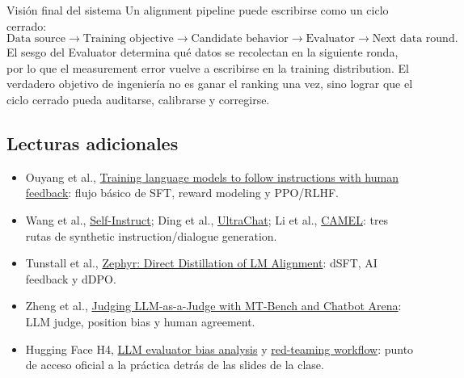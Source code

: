 \begin{importantbox}{Visión final del sistema}
Un alignment pipeline puede escribirse como un ciclo cerrado:
\[
\text{Data source}\rightarrow\text{Training objective}\rightarrow\text{Candidate behavior}
\rightarrow\text{Evaluator}\rightarrow\text{Next data round}.
\]
El sesgo del Evaluator determina qué datos se recolectan en la siguiente ronda, por lo que el measurement error vuelve a escribirse en la training distribution. El verdadero objetivo de ingeniería no es ganar el ranking una vez, sino lograr que el ciclo cerrado pueda auditarse, calibrarse y corregirse.
\end{importantbox}

\subsection{Lecturas adicionales}

\begingroup
\scriptsize
\begin{itemize}[itemsep=0pt,topsep=0.15em,parsep=0pt]
  \item Ouyang et al., \href{https://arxiv.org/abs/2203.02155}{Training language models to follow instructions with human feedback}: flujo básico de SFT, reward modeling y PPO/RLHF.
  \item Wang et al., \href{https://arxiv.org/abs/2212.10560}{Self-Instruct}; Ding et al., \href{https://arxiv.org/abs/2305.14233}{UltraChat}; Li et al., \href{https://arxiv.org/abs/2303.17760}{CAMEL}: tres rutas de synthetic instruction/dialogue generation.
  \item Tunstall et al., \href{https://arxiv.org/abs/2310.16944}{Zephyr: Direct Distillation of LM Alignment}: dSFT, AI feedback y dDPO.
  \item Zheng et al., \href{https://arxiv.org/abs/2306.05685}{Judging LLM-as-a-Judge with MT-Bench and Chatbot Arena}: LLM judge, position bias y human agreement.
  \item Hugging Face H4, \href{https://huggingface.co/blog/llm-leaderboard}{LLM evaluator bias analysis} y \href{https://huggingface.co/blog/red-teaming}{red-teaming workflow}: punto de acceso oficial a la práctica detrás de las slides de la clase.
\end{itemize}
\endgroup


